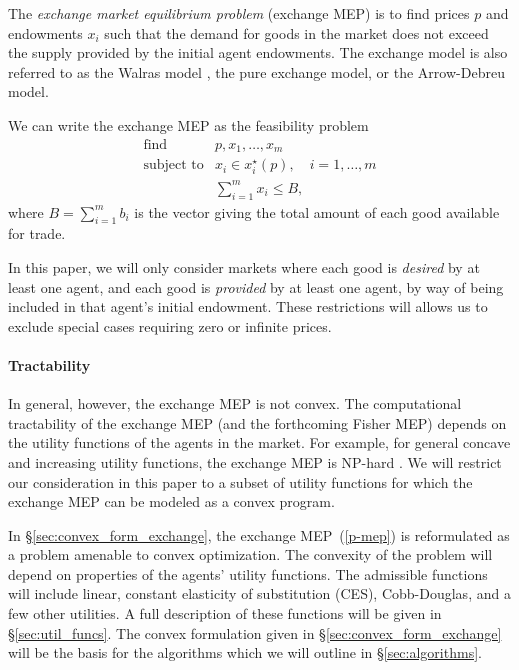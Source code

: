 \documentclass[12pt]{article}
\begin{document}
The \emph{exchange market equilibrium problem} (exchange MEP) is to find prices
$p$ and endowments $x_i$ such that the demand for goods in the market does not
exceed the supply provided by the initial agent endowments. The exchange model
is also referred to as the Walras model \cite{walras1896elements}, the pure
exchange model, or the Arrow-Debreu model.

We can write the exchange MEP as the feasibility problem
\begin{equation}
\label{p-mep}
\begin{array}{ll}
\mbox{find} & p, x_1, \ldots, x_m \\
\mbox{subject to} & x_i \in x_i^\star(p),\quad i = 1,\ldots, m \\
& \sum_{i=1}^m x_i \leq B,
\end{array}
\end{equation}
where $B = \sum_{i=1}^m b_i$ is the vector giving the total amount of each good
available for trade.

In this paper, we will only consider markets where each good is \emph{desired}
by at least one agent, and each good is \emph{provided} by at least one agent,
by way of being included in that agent's initial endowment. These restrictions
will allows us to exclude special cases requiring zero or infinite prices.


\paragraph{Tractability}

In general, however, the exchange MEP is not convex. The computational
tractability of the exchange MEP (and the forthcoming Fisher MEP) depends on
the utility functions of the agents in the market. For example, for general
concave and increasing utility functions, the exchange MEP is NP-hard
\cite{codenotti2006leontief}. We will restrict our consideration in this paper
to a subset of utility functions for which the exchange MEP can be modeled as a
convex program.

In \S\ref{sec:convex_form_exchange}, the exchange MEP~(\ref{p-mep}) is
reformulated as a problem amenable to convex optimization. The convexity of the
problem will depend on properties of the agents' utility functions. The
admissible functions will include linear, constant elasticity of substitution
(CES), Cobb-Douglas, and a few other utilities. A full description of these
functions will be given in \S\ref{sec:util_funcs}. The convex formulation given
in \S\ref{sec:convex_form_exchange} will be the basis for the algorithms which
we will outline in \S\ref{sec:algorithms}.
\end{document}

